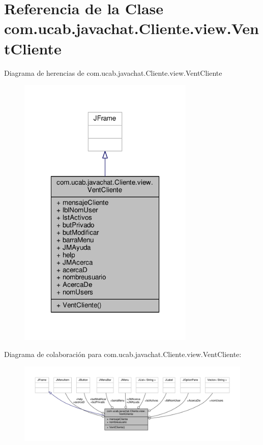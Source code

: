 \hypertarget{classcom_1_1ucab_1_1javachat_1_1_cliente_1_1view_1_1_vent_cliente}{\section{Referencia de la Clase com.\-ucab.\-javachat.\-Cliente.\-view.\-Vent\-Cliente}
\label{classcom_1_1ucab_1_1javachat_1_1_cliente_1_1view_1_1_vent_cliente}
}


Diagrama de herencias de com.\-ucab.\-javachat.\-Cliente.\-view.\-Vent\-Cliente\nopagebreak
\begin{figure}[H]
\begin{center}
\leavevmode
\includegraphics[width=238pt]{classcom_1_1ucab_1_1javachat_1_1_cliente_1_1view_1_1_vent_cliente__inherit__graph}
\end{center}
\end{figure}


Diagrama de colaboración para com.\-ucab.\-javachat.\-Cliente.\-view.\-Vent\-Cliente\-:\nopagebreak
\begin{figure}[H]
\begin{center}
\leavevmode
\includegraphics[width=350pt]{classcom_1_1ucab_1_1javachat_1_1_cliente_1_1view_1_1_vent_cliente__coll__graph}
\end{center}
\end{figure}
